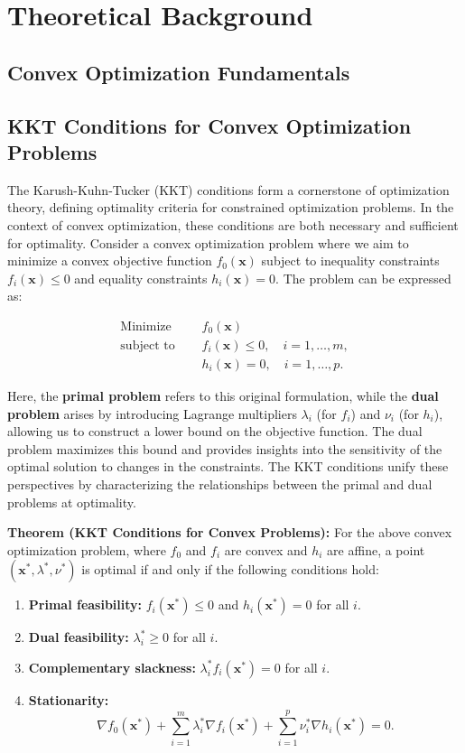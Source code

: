 \documentclass{article}
\begin{document}
\section{Theoretical Background}
\subsection{Convex Optimization Fundamentals}

\subsection{KKT Conditions for Convex Optimization Problems}

The Karush-Kuhn-Tucker (KKT) conditions form a cornerstone of optimization theory, defining optimality criteria for constrained optimization problems. In the context of convex optimization, these conditions are both necessary and sufficient for optimality. Consider a convex optimization problem where we aim to minimize a convex objective function $f_0(\mathbf{x})$ subject to inequality constraints $f_i(\mathbf{x}) \leq 0$ and equality constraints $h_i(\mathbf{x}) = 0$. The problem can be expressed as:

\begin{align*}
    \text{Minimize } & \quad f_0(\mathbf{x}) \\
    \text{subject to } & \quad f_i(\mathbf{x}) \leq 0, \quad i = 1, \dots, m, \\
    & \quad h_i(\mathbf{x}) = 0, \quad i = 1, \dots, p.
\end{align*}

Here, the \textbf{primal problem} refers to this original formulation, while the \textbf{dual problem} arises by introducing Lagrange multipliers $\lambda_i$ (for $f_i$) and $\nu_i$ (for $h_i$), allowing us to construct a lower bound on the objective function. The dual problem maximizes this bound and provides insights into the sensitivity of the optimal solution to changes in the constraints. The KKT conditions unify these perspectives by characterizing the relationships between the primal and dual problems at optimality.

\textbf{Theorem (KKT Conditions for Convex Problems):}  
For the above convex optimization problem, where $f_0$ and $f_i$ are convex and $h_i$ are affine, a point $(\mathbf{x}^*, \lambda^*, \nu^*)$ is optimal if and only if the following conditions hold:
\begin{enumerate}
    \item \textbf{Primal feasibility:} $f_i(\mathbf{x}^*) \leq 0$ and $h_i(\mathbf{x}^*) = 0$ for all $i$.
    \item \textbf{Dual feasibility:} $\lambda_i^* \geq 0$ for all $i$.
    \item \textbf{Complementary slackness:} $\lambda_i^* f_i(\mathbf{x}^*) = 0$ for all $i$.
    \item \textbf{Stationarity:}
    \[
    \nabla f_0(\mathbf{x}^*) + \sum_{i=1}^m \lambda_i^* \nabla f_i(\mathbf{x}^*) + \sum_{i=1}^p \nu_i^* \nabla h_i(\mathbf{x}^*) = 0.
    \]
\end{enumerate}
\end{document}
